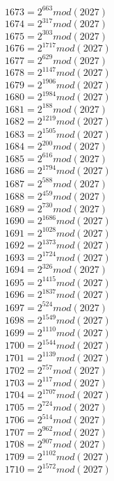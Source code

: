 \documentclass[12pt, letterpaper]{article}
\begin{document}
\begin{itemize}
\begin{multicols}{3}
$1673= 2^{663} mod (2027)$\\
$1674= 2^{317} mod (2027)$\\
$1675= 2^{303} mod (2027)$\\
$1676= 2^{1717} mod (2027)$\\
$1677= 2^{629} mod (2027)$\\
$1678= 2^{1147} mod (2027)$\\
$1679= 2^{1906} mod (2027)$\\
$1680= 2^{1984} mod (2027)$\\
$1681= 2^{188} mod (2027)$\\
$1682= 2^{1219} mod (2027)$\\
$1683= 2^{1505} mod (2027)$\\
$1684= 2^{200} mod (2027)$\\
$1685= 2^{616} mod (2027)$\\
$1686= 2^{1794} mod (2027)$\\
$1687= 2^{588} mod (2027)$\\
$1688= 2^{459} mod (2027)$\\
$1689= 2^{730} mod (2027)$\\
$1690= 2^{1686} mod (2027)$\\
$1691= 2^{1028} mod (2027)$\\
$1692= 2^{1373} mod (2027)$\\
$1693= 2^{1724} mod (2027)$\\
$1694= 2^{326} mod (2027)$\\
$1695= 2^{1415} mod (2027)$\\
$1696= 2^{1837} mod (2027)$\\
$1697= 2^{524} mod (2027)$\\
$1698= 2^{1549} mod (2027)$\\
$1699= 2^{1110} mod (2027)$\\
$1700= 2^{1544} mod (2027)$\\
$1701= 2^{1139} mod (2027)$\\
$1702= 2^{757} mod (2027)$\\
$1703= 2^{117} mod (2027)$\\
$1704= 2^{1707} mod (2027)$\\
$1705= 2^{724} mod (2027)$\\
$1706= 2^{514} mod (2027)$\\
$1707= 2^{962} mod (2027)$\\
$1708= 2^{907} mod (2027)$\\
$1709= 2^{1102} mod (2027)$\\
$1710= 2^{1572} mod (2027)$\\

\end{multicols}
\end{itemize}
\end{document}
